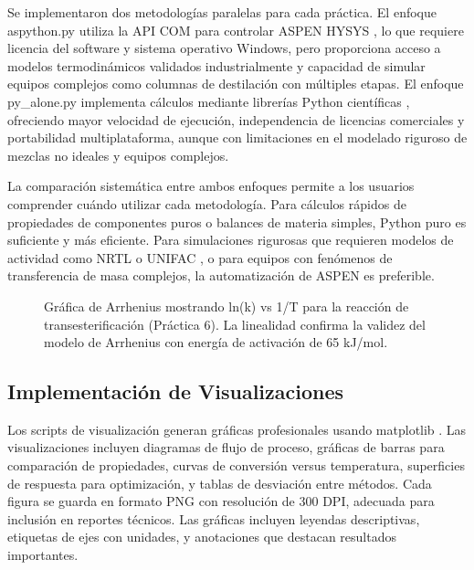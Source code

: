 \documentclass{syx7}
\begin{document}
Se implementaron dos metodologías paralelas para cada práctica. El enfoque aspython.py utiliza la API COM para controlar ASPEN HYSYS \cite{aspentech2020hysys}, lo que requiere licencia del software y sistema operativo Windows, pero proporciona acceso a modelos termodinámicos validados industrialmente \cite{renon1968local,fredenslund1975group} y capacidad de simular equipos complejos como columnas de destilación con múltiples etapas. El enfoque py\_alone.py implementa cálculos mediante librerías Python científicas \cite{virtanen2020scipy,thermo2023}, ofreciendo mayor velocidad de ejecución, independencia de licencias comerciales y portabilidad multiplataforma, aunque con limitaciones en el modelado riguroso de mezclas no ideales y equipos complejos.

La comparación sistemática entre ambos enfoques permite a los usuarios comprender cuándo utilizar cada metodología. Para cálculos rápidos de propiedades de componentes puros o balances de materia simples, Python puro es suficiente y más eficiente. Para simulaciones rigurosas que requieren modelos de actividad como NRTL \cite{renon1968local} o UNIFAC \cite{fredenslund1975group}, o para equipos con fenómenos de transferencia de masa complejos, la automatización de ASPEN es preferible.

\begin{figure}[htb!]
	\centering
	\caption{Gráfica de Arrhenius mostrando ln(k) vs 1/T para la reacción de transesterificación (Práctica 6). La linealidad confirma la validez del modelo de Arrhenius con energía de activación de 65 kJ/mol.}
	\label{fig:arrhenius}
\end{figure}

\subsection{Implementación de Visualizaciones}

Los scripts de visualización generan gráficas profesionales usando matplotlib \cite{hunter2007matplotlib}. Las visualizaciones incluyen diagramas de flujo de proceso, gráficas de barras para comparación de propiedades, curvas de conversión versus temperatura, superficies de respuesta para optimización, y tablas de desviación entre métodos. Cada figura se guarda en formato PNG con resolución de 300 DPI, adecuada para inclusión en reportes técnicos. Las gráficas incluyen leyendas descriptivas, etiquetas de ejes con unidades, y anotaciones que destacan resultados importantes.
\end{document}
